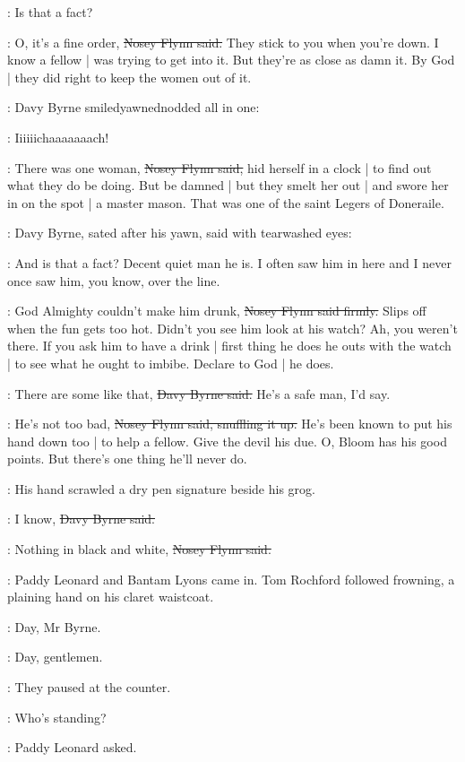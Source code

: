 \davybyrne:
Is that a fact?

\nosey:
O, it's a fine order,
\sout{Nosey Flynn said.}
They stick to you when you're down.
I know a fellow |
was trying to get into it.
But they're as close as damn it.
By God |
they did right to keep the women out of it.

:
Davy Byrne smiledyawnednodded all in one:

\davybyrne:
Iiiiiichaaaaaaach!

\nosey:
There was one woman,
\sout{Nosey Flynn said,}
hid herself in a clock |
to find out what they do be doing.
But be damned |
but they smelt her out |
and swore her in on the spot |
a master mason.
That was one of the saint Legers of Doneraile.

:
Davy Byrne,
sated after his yawn,
said with tearwashed eyes:

\davybyrne:
And is that a fact?
Decent quiet man he is.
I often saw him in here
and I never once saw him,
you know,
over the line.

\nosey:
God Almighty couldn't make him drunk,
\sout{Nosey Flynn said firmly.}
Slips off when the fun gets too hot.
Didn't you see him look at his watch?
Ah, you weren't there.
If you ask him to have a drink |
first thing he does he outs with the watch |
to see what he ought to imbibe.
Declare to God |
he does.

\davybyrne:
There are some like that,
\sout{Davy Byrne said.}
He's a safe man,
I'd say.

\nosey:
He's not too bad,
\sout{Nosey Flynn said, snuffling it up.}
He's been known to put his hand down too |
to help a fellow.
Give the devil his due.
O, Bloom has his good points.
But there's one thing he'll never do.

:
His hand scrawled a dry pen signature beside his grog.

\davybyrne:
I know,
\sout{Davy Byrne said.}

\nosey:
Nothing in black and white,
\sout{Nosey Flynn said.}

:
Paddy Leonard and Bantam Lyons came in.
Tom Rochford followed frowning,
a plaining hand on his claret waistcoat.

\bantam:
Day, Mr Byrne.

\davybyrne:
Day, gentlemen.

:
They paused at the counter.

\leonard:
Who's standing?

:
Paddy Leonard asked.

